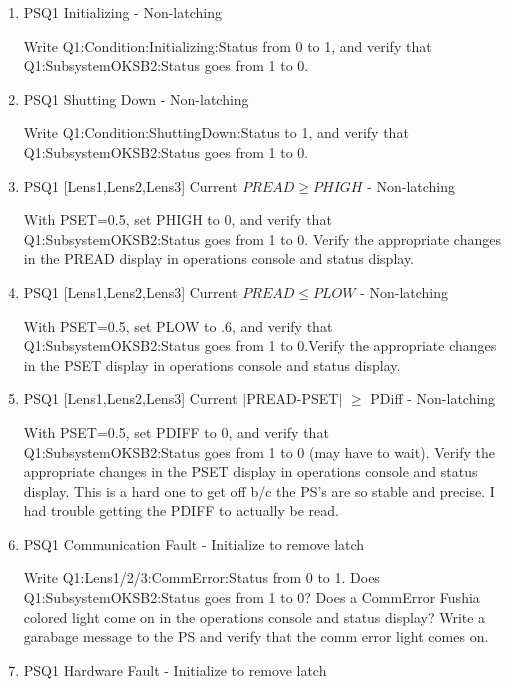 \documentclass[11pt]{book}		%
\begin{document}
\begin{enumerate}
 \item PSQ1 Initializing - Non-latching

\color{red}
Write Q1:Condition:Initializing:Status from 0 to 1, and verify that Q1:SubsystemOKSB2:Status goes from 1 to 0.
\color{black}

 \item PSQ1 Shutting Down - Non-latching

\color{red}
Write Q1:Condition:ShuttingDown:Status to 1, and verify that Q1:SubsystemOKSB2:Status goes from 1 to 0.
\color{black}


 \item PSQ1 [Lens1,Lens2,Lens3] Current $PREAD \geq PHIGH$ - Non-latching

\color{red}
With PSET=0.5, set PHIGH to 0, and verify that Q1:SubsystemOKSB2:Status goes from 1 to 0. Verify the appropriate changes in the PREAD display in operations console and status display.
\color{black}

 \item PSQ1 [Lens1,Lens2,Lens3] Current $PREAD \leq PLOW$ - Non-latching

\color{red}
With PSET=0.5, set PLOW to .6, and verify that Q1:SubsystemOKSB2:Status goes from 1 to 0.Verify the appropriate changes in the PSET display in operations console and status display.
\color{black}

 \item PSQ1 [Lens1,Lens2,Lens3] Current $\mid$PREAD-PSET$\mid$  $\geq$ PDiff - Non-latching

\color{red}
With PSET=0.5, set PDIFF to 0, and verify that Q1:SubsystemOKSB2:Status goes from 1 to 0 (may have to wait). Verify the appropriate changes in the PSET display in operations console and status display. This is a hard one to get off b/c the PS's are so stable and precise. I had trouble getting the PDIFF to actually be read.
\color{black}

 \item PSQ1 Communication Fault - Initialize to remove latch

\color{red}
Write Q1:Lens1/2/3:CommError:Status from 0 to 1. Does Q1:SubsystemOKSB2:Status goes from 1 to 0? Does a CommError Fushia colored light come on in the operations console and status display? Write a garabage message to the PS and verify that the comm error light comes on.
\color{black}

 \item PSQ1 Hardware Fault - Initialize to remove latch


\end{enumerate}
\end{document}
